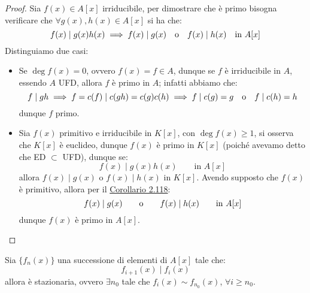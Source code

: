 \documentclass[11pt]{scrartcl}
\begin{document}
\begin{proof}
    Sia $f(x) \in A[x]$ irriducibile, per dimostrare che è primo bisogna verificare che $\forall g(x),h(x) \in A[x]$ si ha che:
    \[ f(x) \mid g(x)h(x) \implies f(x) \mid g(x) \quad \text o \quad f(x) \mid h(x) \quad \text{in $A[x]$}
        \]
    Distinguiamo due casi:
    \begin{itemize}
        \item Se $\deg f(x) = 0$, ovvero $f(x) = f \in A$, dunque se $f$ è irriducibile in $A$, essendo $A$ UFD, allora $f$ è primo in $A$;
        infatti abbiamo che:
        \[ f \mid gh \implies f = c(f) \mid c(gh) = c(g)c(h) \implies f \mid c(g) = g \quad \text o \quad f \mid c(h) = h
            \]
        dunque $f$ primo.
        \item Sia $f(x)$ primitivo e irriducibile in $K[x]$, con $\deg f(x) \geq 1$, si osserva che $K[x]$ è euclideo, dunque $f(x)$ è primo
        in $K[x]$ (poiché avevamo detto che ED $\subset$ UFD), dunque se:
        \[ f(x) \mid g(x)h(x) \qquad \text{in $A[x]$}
            \]
        allora $f(x) \mid g(x)$ o $f(x) \mid h(x)$ in $K[x]$. Avendo supposto che $f(x)$ è primitivo, allora per il \hyperref[2.118]{Corollario 2.118}:
        \[ f(x) \mid g(x) \qquad \text o \qquad f(x) \mid h(x) \qquad \text{in $A[x]$}
            \]
        dunque $f(x)$ è primo in $A[x]$.
    \end{itemize}
\end{proof}

\begin{proposition}
    Sia $\{f_n(x)\}$ una successione di elementi di $A[x]$ tale che:
    \[ f_{i+1}(x) \mid f_i(x)
        \]
    allora è stazionaria, ovvero $\exists n_0$ tale che $f_i(x) \sim f_{n_0}(x)$, $\forall i \geq n_0$.
\end{proposition}
\end{document}
